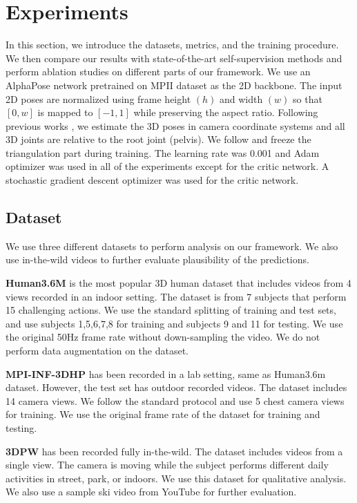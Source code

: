 \documentclass[10pt,twocolumn,letterpaper]{article}
\begin{document}
\section{Experiments}

In this section, we introduce the datasets, metrics, and the training procedure. We then compare our results with state-of-the-art self-supervision methods and perform ablation studies on different parts of our framework. We use an AlphaPose network \cite{xiu2018poseflow, fang2017rmpe} pretrained on MPII dataset \cite{Andriluka_2014_CVPR} as the 2D backbone. The input 2D poses are normalized using frame height $(h)$ and width $(w)$ so that $[0, w]$ is mapped to $[-1, 1]$ while preserving the aspect ratio. Following previous works \cite{Martinez_2017_ICCV,Pavllo_2019_CVPR,Hossain_2018_ECCV}, we estimate the 3D poses in camera coordinate systems and all 3D joints are relative to the root joint (pelvis). We follow \cite{Kocabas_2019_CVPR} and freeze the triangulation part during training. The learning rate was 0.001 and Adam optimizer was used in all of the experiments except for the critic network. A stochastic gradient descent optimizer was used for the critic network.    
\subsection{Dataset}
We use three different datasets to perform analysis on our framework. We also use in-the-wild videos to further evaluate plausibility of the predictions.

\textbf{Human3.6M} \cite{h36m_pami} is the most popular 3D human dataset that includes videos from 4 views recorded in an indoor setting. The dataset is from 7 subjects that perform 15 challenging actions. We use the standard splitting of training and test sets, and use subjects 1,5,6,7,8 for training and subjects 9 and 11 for testing. We use the original 50Hz frame rate without down-sampling the video. We do not perform data augmentation on the dataset.

\textbf{MPI-INF-3DHP} \cite{mehta2017monocular} has been recorded in a lab setting, same as Human3.6m dataset. However, the test set has outdoor recorded videos. The dataset includes 14 camera views. We follow the standard protocol and use 5 chest camera views for training. We use the original frame rate of the dataset for training and testing. 

\textbf{3DPW} \cite{vonMarcard2018} has been recorded fully in-the-wild. The dataset includes videos from a single view. The camera is moving while the subject performs different daily activities in street, park, or indoors. We use this dataset for qualitative analysis. We also use a sample ski video from YouTube for further evaluation. 
\end{document}
